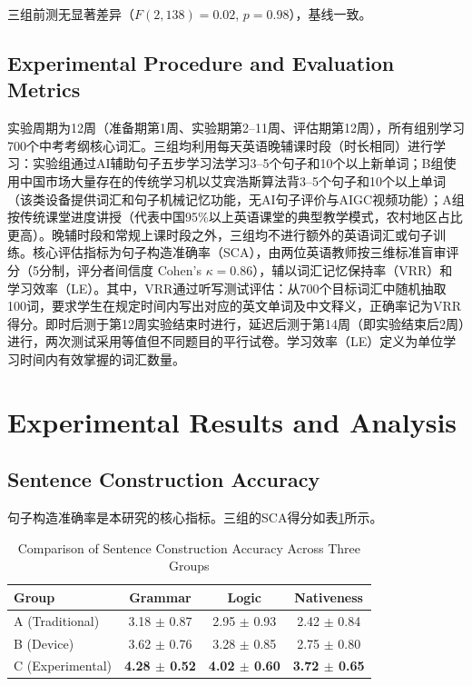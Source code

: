 \documentclass[12pt,a4paper]{ctexart}
\begin{document}
三组前测无显著差异（$F(2,138)=0.02$, $p=0.98$），基线一致。

\subsection{Experimental Procedure and Evaluation Metrics}
实验周期为12周（准备期第1周、实验期第2--11周、评估期第12周），所有组别学习700个中考考纲核心词汇。三组均利用每天英语晚辅课时段（时长相同）进行学习：实验组通过AI辅助句子五步学习法学习3--5个句子和10个以上新单词；B组使用中国市场大量存在的传统学习机以艾宾浩斯算法背3--5个句子和10个以上单词（该类设备提供词汇和句子机械记忆功能，无AI句子评价与AIGC视频功能）；A组按传统课堂进度讲授（代表中国95\%以上英语课堂的典型教学模式，农村地区占比更高）。晚辅时段和常规上课时段之外，三组均不进行额外的英语词汇或句子训练。核心评估指标为句子构造准确率（SCA），由两位英语教师按三维标准盲审评分（5分制，评分者间信度 Cohen's $\kappa = 0.86$），辅以词汇记忆保持率（VRR）和学习效率（LE）。其中，VRR通过听写测试评估：从700个目标词汇中随机抽取100词，要求学生在规定时间内写出对应的英文单词及中文释义，正确率记为VRR得分。即时后测于第12周实验结束时进行，延迟后测于第14周（即实验结束后2周）进行，两次测试采用等值但不同题目的平行试卷。学习效率（LE）定义为单位学习时间内有效掌握的词汇数量。


\section{Experimental Results and Analysis}  %

\subsection{Sentence Construction Accuracy}
句子构造准确率是本研究的核心指标。三组的SCA得分如表\ref{tab:sca}所示。

\begin{table}[H]
\centering
\small
\caption{Comparison of Sentence Construction Accuracy Across Three Groups\label{tab:sca}}
\begin{tabular}{lccc}
\toprule
\textbf{Group} & \textbf{Grammar} & \textbf{Logic} & \textbf{Nativeness} \\
\midrule
A (Traditional) & 3.18 $\pm$ 0.87 & 2.95 $\pm$ 0.93 & 2.42 $\pm$ 0.84 \\
B (Device) & 3.62 $\pm$ 0.76 & 3.28 $\pm$ 0.85 & 2.75 $\pm$ 0.80 \\
C (Experimental) & \textbf{4.28 $\pm$ 0.52} & \textbf{4.02 $\pm$ 0.60} & \textbf{3.72 $\pm$ 0.65} \\
\bottomrule
\end{tabular}
\end{table}
\end{document}
